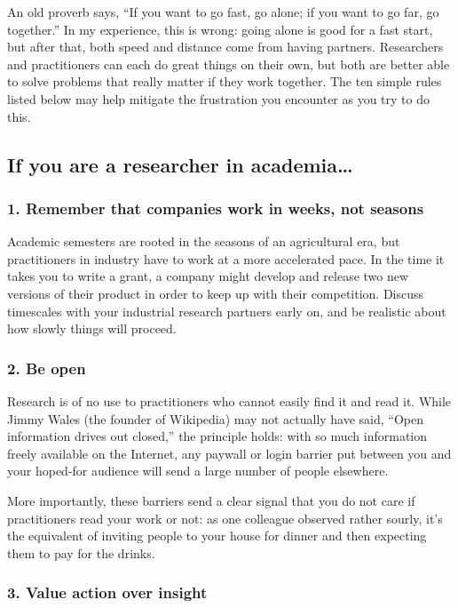 \documentclass[10pt,letterpaper]{article}
\begin{document}
An old proverb says, ``If you want to go fast, go alone; if you want to go far,
go together.''  In my experience, this is wrong: going alone is good for a fast
start, but after that, both speed and distance come from having partners.
Researchers and practitioners can each do great things on their own, but both
are better able to solve problems that really matter if they work together.
The ten simple rules listed below may help mitigate the
frustration you encounter as you try to do this.

\subsection*{If you are a researcher in academia{\ldots}}

\subsubsection*{1. Remember that companies work in weeks, not seasons}

Academic semesters are rooted in the seasons of an agricultural era, but
practitioners in industry have to work at a more accelerated pace. In the time
it takes you to write a grant, a company might develop and release two new
versions of their product in order to keep up with their competition. Discuss
timescales with your industrial research partners early on, and be realistic
about how slowly things will proceed.

\subsubsection*{2. Be open}

Research is of no use to practitioners who cannot easily find it and read
it. While Jimmy Wales (the founder of Wikipedia) may not actually have said,
``Open information drives out closed,'' the principle holds: with so much
information freely available on the Internet, any paywall or login barrier put
between you and your hoped-for audience will send a large number of people
elsewhere.

More importantly, these barriers send a clear signal that you do not care if
practitioners read your work or not: as one colleague observed rather sourly,
it's the equivalent of inviting people to your house for dinner and then
expecting them to pay for the drinks.

\subsubsection*{3. Value action over insight}
\end{document}
